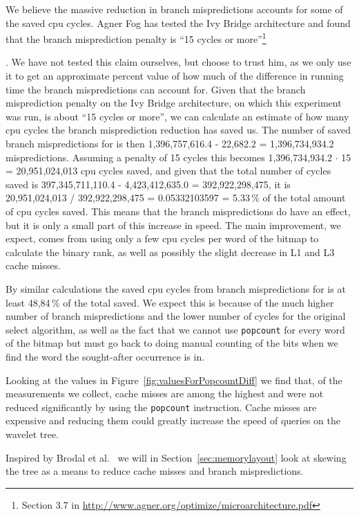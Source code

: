 We believe the massive reduction in branch mispredictions accounts for some of the saved cpu cycles.
Agner Fog has tested the Ivy Bridge architecture and found that the branch misprediction penalty is “15 cycles or more”\footnote{Section 3.7 in \url{http://www.agner.org/optimize/microarchitecture.pdf}}\addtocounter{footnote}{-1}\addtocounter{Hfootnote}{-1}.
We have not tested this claim ourselves, but choose to trust him, as we only use it to  get an approximate percent value of how much of the difference in running time the branch mispredictions can account for.
Given that the branch misprediction penalty on the Ivy Bridge architecture, on which this experiment was run, is about “15 cycles or more”\footnotemark, we can calculate an estimate of how many cpu cycles the branch misprediction reduction has saved us.
The number of saved branch mispredictions for  is then 1,396,757,616.4 - 22,682.2 = 1,396,734,934.2 mispredictions. Assuming a penalty of 15 cycles this becomes 1,396,734,934.2 $\cdot$ 15 = 20,951,024,013 cpu cycles saved, and given that the total number of cycles saved is 397,345,711,110.4 - 4,423,412,635.0 = 392,922,298,475, it is 20,951,024,013 / 392,922,298,475 = 0.05332103597 = 5.33\,\% of the total amount of cpu cycles saved.
This means that the branch mispredictions do have an effect, but it is only a small part of this increase in speed. The main improvement, we expect, comes from using only a few cpu cycles per word of the bitmap to calculate the binary rank, as well as possibly the slight decrease in L1 and L3 cache misses.



By similar calculations the saved cpu cycles from branch mispredictions for  is at least 48,84\,\% of the total saved. We expect this is because of the much higher number of branch mispredictions and the lower number of cycles for the original select algorithm, as well as the fact that we cannot use \texttt{popcount} for every word of the bitmap but must go back to doing manual counting of the bits when we find the word the sought-after occurrence is in.

Looking at the values in Figure~\ref{fig:valuesForPopcountDiff} we find that, of the measurements we collect, cache misses are among the highest and were not reduced significantly by using the \texttt{popcount} instruction.
Cache misses are expensive and reducing them could greatly increase the speed of queries on the wavelet tree.

Inspired by Brodal et al.~ we will in Section~\ref{sec:memorylayout} look at skewing the tree as a means to reduce cache misses and branch mispredictions.



